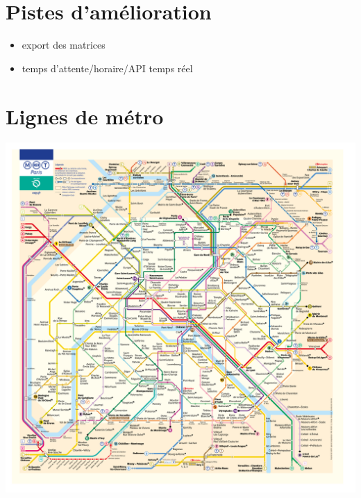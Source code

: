 \documentclass[,french]{article}
\begin{document}
\hypertarget{sec:amelioration}{%
\section{Pistes d'amélioration}\label{sec:amelioration}}

\begin{itemize}
\item
  export des matrices
\item
  temps d'attente/horaire/API temps réel
\end{itemize}

\hypertarget{sec:lignes_metro}{%
\section{Lignes de métro}\label{sec:lignes_metro}}

\includegraphics{img/plan_lignes/Plan-Metro.pdf}
\end{document}
